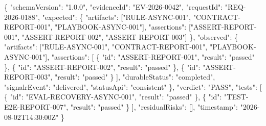 \documentclass[
  10pt,
  a4paper,
  oneside]{book}
\newenvironment{Shaded}{}{}
\newcommand{\DataTypeTok}[1]{\textcolor[rgb]{0.56,0.13,0.00}{#1}}
\newcommand{\FunctionTok}[1]{\textcolor[rgb]{0.02,0.16,0.49}{#1}}
\newcommand{\OtherTok}[1]{\textcolor[rgb]{0.00,0.44,0.13}{#1}}
\newcommand{\StringTok}[1]{\textcolor[rgb]{0.25,0.44,0.63}{#1}}
\begin{document}
\begin{Shaded}
\begin{Highlighting}[]
\FunctionTok{\{}
  \DataTypeTok{"schemaVersion"}\FunctionTok{:} \StringTok{"1.0.0"}\FunctionTok{,}
  \DataTypeTok{"evidenceId"}\FunctionTok{:} \StringTok{"EV{-}2026{-}0042"}\FunctionTok{,}
  \DataTypeTok{"requestId"}\FunctionTok{:} \StringTok{"REQ{-}2026{-}0188"}\FunctionTok{,}
  \DataTypeTok{"expected"}\FunctionTok{:} \FunctionTok{\{}
    \DataTypeTok{"artifacts"}\FunctionTok{:} \OtherTok{[}\StringTok{"RULE{-}ASYNC{-}001"}\OtherTok{,} \StringTok{"CONTRACT{-}REPORT{-}001"}\OtherTok{,} \StringTok{"PLAYBOOK{-}ASYNC{-}001"}\OtherTok{]}\FunctionTok{,}
    \DataTypeTok{"assertions"}\FunctionTok{:} \OtherTok{[}\StringTok{"ASSERT{-}REPORT{-}001"}\OtherTok{,} \StringTok{"ASSERT{-}REPORT{-}002"}\OtherTok{,} \StringTok{"ASSERT{-}REPORT{-}003"}\OtherTok{]}
  \FunctionTok{\},}
  \DataTypeTok{"observed"}\FunctionTok{:} \FunctionTok{\{}
    \DataTypeTok{"artifacts"}\FunctionTok{:} \OtherTok{[}\StringTok{"RULE{-}ASYNC{-}001"}\OtherTok{,} \StringTok{"CONTRACT{-}REPORT{-}001"}\OtherTok{,} \StringTok{"PLAYBOOK{-}ASYNC{-}001"}\OtherTok{]}\FunctionTok{,}
    \DataTypeTok{"assertions"}\FunctionTok{:} \OtherTok{[}
      \FunctionTok{\{} \DataTypeTok{"id"}\FunctionTok{:} \StringTok{"ASSERT{-}REPORT{-}001"}\FunctionTok{,} \DataTypeTok{"result"}\FunctionTok{:} \StringTok{"passed"} \FunctionTok{\}}\OtherTok{,}
      \FunctionTok{\{} \DataTypeTok{"id"}\FunctionTok{:} \StringTok{"ASSERT{-}REPORT{-}002"}\FunctionTok{,} \DataTypeTok{"result"}\FunctionTok{:} \StringTok{"passed"} \FunctionTok{\}}\OtherTok{,}
      \FunctionTok{\{} \DataTypeTok{"id"}\FunctionTok{:} \StringTok{"ASSERT{-}REPORT{-}003"}\FunctionTok{,} \DataTypeTok{"result"}\FunctionTok{:} \StringTok{"passed"} \FunctionTok{\}}
    \OtherTok{]}\FunctionTok{,}
    \DataTypeTok{"durableStatus"}\FunctionTok{:} \StringTok{"completed"}\FunctionTok{,}
    \DataTypeTok{"signalrEvent"}\FunctionTok{:} \StringTok{"delivered"}\FunctionTok{,}
    \DataTypeTok{"statusApi"}\FunctionTok{:} \StringTok{"consistent"}
  \FunctionTok{\},}
  \DataTypeTok{"verdict"}\FunctionTok{:} \StringTok{"PASS"}\FunctionTok{,}
  \DataTypeTok{"tests"}\FunctionTok{:} \OtherTok{[}
    \FunctionTok{\{} \DataTypeTok{"id"}\FunctionTok{:} \StringTok{"EVAL{-}RECOVERY{-}ASYNC{-}001"}\FunctionTok{,} \DataTypeTok{"result"}\FunctionTok{:} \StringTok{"passed"} \FunctionTok{\}}\OtherTok{,}
    \FunctionTok{\{} \DataTypeTok{"id"}\FunctionTok{:} \StringTok{"TEST{-}E2E{-}REPORT{-}007"}\FunctionTok{,} \DataTypeTok{"result"}\FunctionTok{:} \StringTok{"passed"} \FunctionTok{\}}
  \OtherTok{]}\FunctionTok{,}
  \DataTypeTok{"residualRisks"}\FunctionTok{:} \OtherTok{[]}\FunctionTok{,}
  \DataTypeTok{"timestamp"}\FunctionTok{:} \StringTok{"2026{-}08{-}02T14:30:00Z"}
\FunctionTok{\}}
\end{Highlighting}
\end{Shaded}
\end{document}
